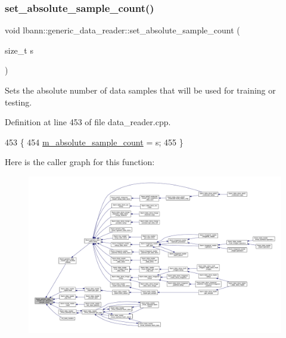 \subsubsection{\texorpdfstring{set\+\_\+absolute\+\_\+sample\+\_\+count()}{set\_absolute\_sample\_count()}}
{\footnotesize\ttfamily void lbann\+::generic\+\_\+data\+\_\+reader\+::set\+\_\+absolute\+\_\+sample\+\_\+count (\begin{DoxyParamCaption}\item[{size\+\_\+t}]{s }\end{DoxyParamCaption})}

Sets the absolute number of data samples that will be used for training or testing. 

Definition at line 453 of file data\+\_\+reader.\+cpp.


\begin{DoxyCode}
453                                                             \{
454   \hyperlink{classlbann_1_1generic__data__reader_a462437ed899bc26ebec9ab2091980d0c}{m\_absolute\_sample\_count} = s;
455 \}
\end{DoxyCode}
Here is the caller graph for this function\+:\nopagebreak
\begin{figure}[H]
\begin{center}
\leavevmode
\includegraphics[width=350pt]{classlbann_1_1generic__data__reader_aa2d83c4ffc58534e0c193b6b9f9fb925_icgraph}
\end{center}
\end{figure}
\mbox{\label{classlbann_1_1generic__data__reader_adcf4c6012f44c78589bb75ea530cf518}} 
